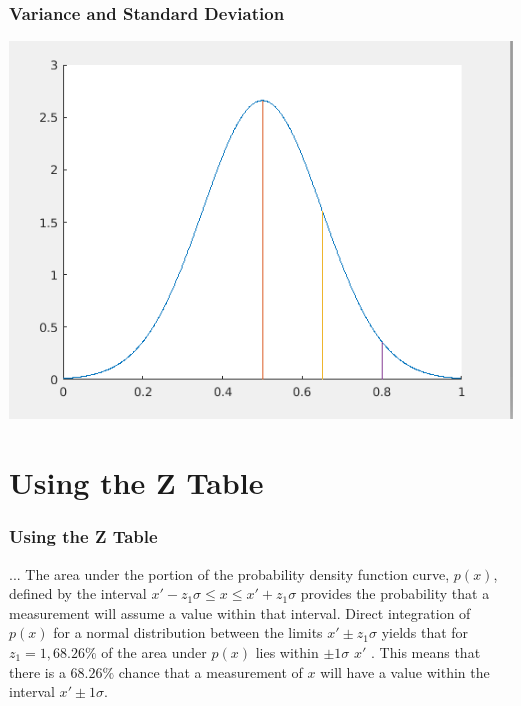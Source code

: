 \documentclass[fleqn]{beamer} %
\newcommand{\sectiontitleII}{Variance and Standard Deviation}
\newcommand{\sectiontitleIII}{Using the Z Table}
\begin{document}
	\begin{frame} \small
		\frametitle{\sectiontitleII}    

		\includegraphics[scale=.50]{lecture1_fig1.png}		
		
	\end{frame}


\section{\sectiontitleIII}	

	\begin{frame}[label=sectionIII] \small
		\frametitle{\sectiontitleIII}    
	
		
		... The area under the portion of the probability density function curve, $p(x)$, defined by the interval $x'-z_1\sigma \leq x \leq x' +z_1\sigma$ provides the probability that a measurement will assume a value within that interval. Direct integration of $p(x)$ for a normal
distribution between the limits $x'\pm z_1\sigma$ yields that for $z_1=1, 68.26\%$ of the area under $p(x)$ lies
within $\pm 1\sigma$   $x'$ . This means that there is a $68.26\%$ chance that a measurement of $x$ will have a
value within the interval $x'\pm 1\sigma$.
			

	\end{frame}
\end{document}

